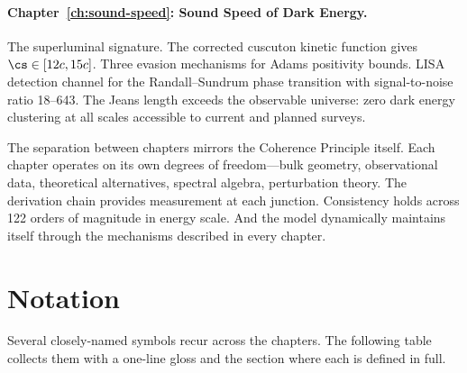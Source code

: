 \paragraph{Chapter~\ref{ch:sound-speed}: Sound Speed of Dark Energy.}
The superluminal signature. The corrected cuscuton kinetic function
gives $\cs \in [12c, 15c]$. Three evasion mechanisms for Adams
positivity bounds. LISA detection channel for the Randall--Sundrum
phase transition with signal-to-noise ratio 18--643. The Jeans length
exceeds the observable universe: zero dark energy clustering at all
scales accessible to current and planned surveys.

\medskip

The separation between chapters mirrors the Coherence Principle
itself. Each chapter operates on its own degrees of freedom---bulk
geometry, observational data, theoretical alternatives, spectral
algebra, perturbation theory. The derivation chain provides
measurement at each junction. Consistency holds across 122 orders of
magnitude in energy scale. And the model dynamically maintains itself
through the mechanisms described in every chapter.

\section{Notation}
\label{sec:0-notation}

Several closely-named symbols recur across the chapters. The following
table collects them with a one-line gloss and the section where each
is defined in full.


